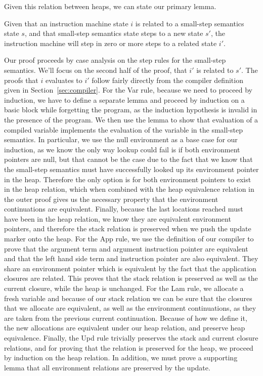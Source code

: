 Given this relation between heaps, we can state our primary lemma.
\begin{lemma} \label{lem:cesm_im}
Given that an instruction machine state $i$ is related to a small-step
semantics state $s$, and that small-step semantics state steps to a new state
$s'$, the instruction machine will step in zero or more steps to a related state
$i'$.
\end{lemma}
\begin{proofoutline}
Our proof proceeds by case analysis on the step rules for the small-step
semantics. We'll focus on the second half of the proof, that $i'$ is related to
$s'$. The proofs that $i$ evaluates to $i'$ follow fairly directly from the
compiler definition given in Section~\ref{sec:compiler}. For the Var rule,
because we need to proceed by induction, we have to define a separate lemma and
proceed by induction on a basic block while forgetting the program, as the
induction hypothesis is invalid in the presence of the program. We then use the
lemma to show that evaluation of a compiled variable implements the evaluation
of the variable in the small-step semantics. In particular, we use the null
environment as a base case for our induction, as we know the only way lookup
could fail is if both environment pointers are null, but that cannot be the
case due to the fact that we know that the small-step semantics must have
successfully looked up its environment pointer in the heap. Therefore the only
option is for both environment pointers to exist in the heap relation, which
when combined with the heap equivalence relation in the outer proof gives us the
necessary property that the environment continuations are equivalent. Finally,
because the last locations reached must have been in the heap relation, we know
they are equivalent environment pointers, and therefore the stack relation is
preserved when we push the update marker onto the heap. For the App rule, we use
the definition of our compiler to prove that the argument term and argument
instruction pointer are equivalent and that the left hand side term and
instruction pointer are also equivalent. They share an environment pointer which
is equivalent by the fact that the application closures are related.  This
proves that the stack relation is preserved as well as the current closure,
while the heap is unchanged. For the Lam rule, we allocate a fresh variable and
because of our stack relation we can be sure that the closures that we
allocate are equivalent, as well as the environment continuations, as they are
taken from the previous current continuation. Because of how we define it, the
new allocations are equivalent under our heap relation, and preserve heap
equivalence. Finally, the Upd rule trivially preserves the stack and current
closure relations, and for proving that the relation is preserved for the
heap, we proceed by induction on the heap relation. In addition, we must prove
a supporting lemma that all environment relations are preserved by the update.
\end{proofoutline}


